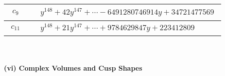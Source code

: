 \documentclass[1p]{elsarticle_modified}
\theoremstyle{definition}
\begin{document}
\begin{tabular}{m{50pt}|m{274pt}}
\hline $$\begin{aligned}c_{9}\end{aligned}$$&$\begin{aligned}
&y^{148}+42 y^{147}+\cdots-6491280746914 y+34721477569
\end{aligned}$\\
\hline $$\begin{aligned}c_{11}\end{aligned}$$&$\begin{aligned}
&y^{148}+21 y^{147}+\cdots+9784629847 y+223412809
\end{aligned}$\\
\hline
\end{tabular}\\~\\
\newpage\flushleft \textbf{(vi) Complex Volumes and Cusp Shapes}
\end{document}
